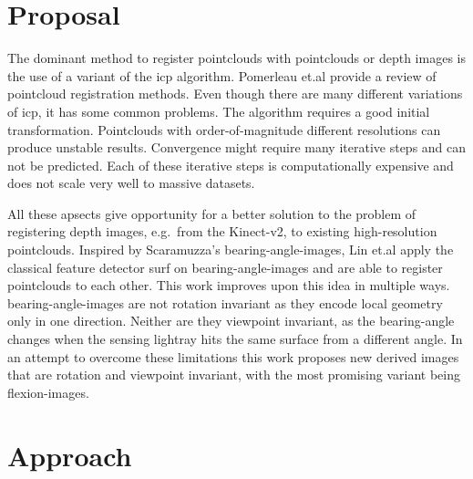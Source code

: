 \documentclass[doktyp=marbeit,fontsize=12pt,sprache=english,draft=true,hausschrift=true,fleqn]{TUBAFarbeiten}
\begin{document}
\maketitle

\TUBAFErklaerungsseite%
\tableofcontents
\newpage

\printglossary[type=\acronymtype]%
\newpage

\printglossary[type=symbols]%
\glsaddallunused[symbols]
\newpage


\section{Proposal}

The dominant method to register pointclouds with pointclouds or depth
images is the use of a variant of the \gls{icp}\cite{Besl1992}
algorithm. Pomerleau et.al\cite{Pomerleau2015} provide a review of pointcloud registration methods.
Even though there are many different variations of \gls{icp}, it has
some common problems. The algorithm requires a good initial
transformation. Pointclouds with order-of-magnitude different
resolutions can produce unstable results. Convergence might require many
iterative steps and can not be predicted. Each of these iterative steps
is computationally expensive and does not scale very well to massive
datasets.

All these apsects give opportunity for a better solution to the problem
of registering depth images, e.g.~from the Kinect-v2, to existing
high-resolution pointclouds.
Inspired by Scaramuzza's \Glspl{bearing-angle-image}\cite{Scaramuzza2007}, Lin et.al\cite{Lin2017} apply the classical feature detector \gls{surf}\cite{Bay2006} on \Glspl{bearing-angle-image} and are able to register pointclouds to each other.
This work improves upon this idea in multiple ways.
\Glspl{bearing-angle-image} are not rotation invariant as they encode local geometry only in one direction.
Neither are they viewpoint invariant, as the \gls{bearing-angle} changes when the sensing lightray hits the same surface from a different angle.
In an attempt to overcome these limitations this work proposes new derived images that are rotation and viewpoint invariant, with the most promising variant being \Glspl{flexion-image}.

\section{Approach}\label{approach}
\end{document}
